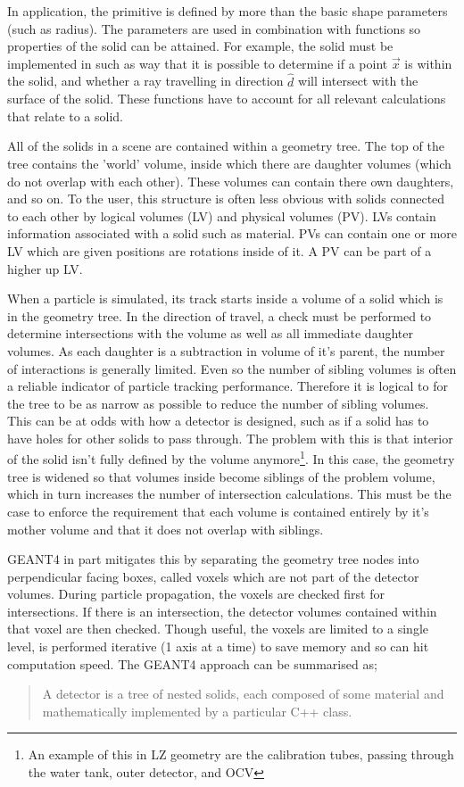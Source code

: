 \par
In application, the primitive is defined by more than the basic shape parameters (such as radius).
The parameters are used in combination with functions so properties of the solid can be attained.
For example, the solid must be implemented in such as way that it is possible to determine if a point $\vec{x}$ is within the solid, and whether a ray travelling in direction $\hat{d}$ will intersect with the surface of the solid.
These functions have to account for all relevant calculations that relate to a solid.
\par
All of the solids in a scene are contained within a geometry tree.
The top of the tree contains the 'world' volume, inside which there are daughter volumes (which do not overlap with each other).
These volumes can contain there own daughters, and so on.
To the user, this structure is often less obvious with solids connected to each other by logical volumes (LV) and physical volumes (PV).
LVs contain information associated with a solid such as material. 
PVs can contain one or more LV which are given positions are rotations inside of it. 
A PV can be part of a higher up LV.
\par
When a particle is simulated, its track starts inside a volume of a solid which is in the geometry tree.
In the direction of travel, a check must be performed to determine intersections with the volume as well as all immediate daughter volumes.
As each daughter is a subtraction in volume of it's parent, the number of interactions is generally limited.
Even so the number of sibling volumes is often a reliable indicator of particle tracking performance.
Therefore it is logical to for the tree to be as narrow as possible to reduce the number of sibling volumes.
This can be at odds with how a detector is designed, such as if a solid has to have holes for other solids to pass through.
The problem with this is that interior of the solid isn't fully defined by the volume anymore\footnote{An example of this in LZ geometry are the calibration tubes, passing through the water tank, outer detector, and OCV}.
In this case, the geometry tree is widened so that volumes inside become siblings of the problem volume, which in turn increases the number of intersection calculations.
This must be the case to enforce the requirement that each volume is contained entirely by it's mother volume and that it does not overlap with siblings.
\par
GEANT4 in part mitigates this by separating the geometry tree nodes into perpendicular facing boxes, called voxels \cite{geant4_voxel_ref} which are not part of the detector volumes.
During particle propagation, the voxels are checked first for intersections.
If there is an intersection, the detector volumes contained within that voxel are then checked.
Though useful, the voxels are limited to a single level, is performed iterative (1 axis at a time) to save memory and so can hit computation speed.
The GEANT4 approach can be summarised as;
\begin{quote}
    A detector is a tree of nested solids, each composed of some material and mathematically implemented by a particular C++ class.
\end{quote}

